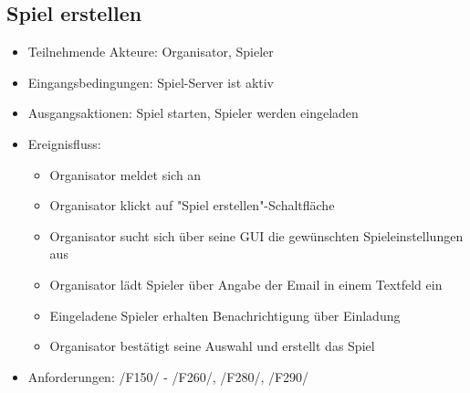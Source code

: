 \documentclass[a4paper]{scrreprt}
\begin{document}

    \subsection{Spiel erstellen}
    \begin{itemize}
        \item Teilnehmende Akteure: \Gls{Organisator}, \Gls{Spieler}
        \item Eingangsbedingungen: Spiel-Server ist aktiv
        \item Ausgangsaktionen: Spiel starten, \Gls{Spieler} werden eingeladen
        \item Ereignisfluss:
        \begin{itemize}
            \item \Gls{Organisator} meldet sich an
            \item \Gls{Organisator} klickt auf "Spiel erstellen"-Schaltfläche
            \item \Gls{Organisator} sucht sich über seine GUI die gewünschten \Gls{Spieleinstellungen} aus
            \item \Gls{Organisator} lädt \Gls{Spieler} über Angabe der Email in einem Textfeld ein
            \item Eingeladene \Gls{Spieler} erhalten Benachrichtigung über Einladung
            \item \Gls{Organisator} bestätigt seine Auswahl und erstellt das Spiel
        \end{itemize}
        \item Anforderungen: /F150/ - /F260/, /F280/, /F290/
    \end{itemize}
\end{document}

